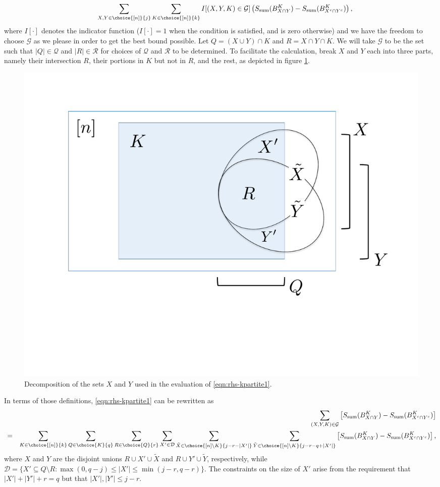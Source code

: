 \documentclass[12pt]{article}
\newcommand{\beq}{\begin{eqnarray}}
\newcommand{\eeq}{\end{eqnarray}}
\def\Sadd{{S_{\text{sum}}}}
\numberwithin{equation}{section}
\begin{document}
\beq
&\,& \sum_{X,Y \in \choice{[n]}{j}} \sum_{K \in \choice{[n]}{k}}
	I[ (X,Y,K) \in \mathcal{G} ]
	\left( \Sadd( B_{X \cap Y }^K ) - \Sadd( B^K_{X^c \cap Y^c} ) \right), \label{eqn:rhs-kpartite1}
\eeq
where $I[\cdot]$ denotes the indicator function ($I[{\cdot}] =1$ when the condition is satisfied, and is zero otherwise) and we have the freedom to choose $\mathcal{G}$ as we please in order to get the best bound possible. Let $Q= (X \cup Y) \cap K$ and $R = X \cap Y \cap K$. We will take $\mathcal{G}$ to be the set such that $|Q| \in \mathcal{Q}$ and $|R| \in \mathcal{R}$ for choices of $\mathcal{Q}$ and $\mathcal{R}$ to be determined. To facilitate the calculation, break $X$ and $Y$ each into three parts, namely their intersection $R$, their portions in $K$ but not in $R$, and the rest, as depicted in figure \ref{fig:combipic}.
%
\begin{figure}
\centering
\includegraphics[keepaspectratio,width=0.5\linewidth]{combipic.pdf}
\caption{Decomposition of the sets $X$ and $Y$ used in the evaluation of \eqref{eqn:rhs-kpartite1}.}
\label{fig:combipic}
\end{figure}
%
In terms of those definitions, \eqref{eqn:rhs-kpartite1} can be rewritten as
\beq
&\,& \sum_{(X,Y,K)\in \mathcal{G}}
	\left[ \Sadd( B_{X \cap Y }^K ) - \Sadd( B^K_{X^c \cap Y^c} ) \right] \\
&=& \sum_{K \in \choice{[n]}{k}} \sum_{Q \in \choice{K}{q}} \sum_{R \in \choice{Q}{r}}
	\sum_{X' \in \mathcal{D}} \sum_{\tilde{X} \in \choice{[n] \setminus K}{j-r-|X'|}}
	\sum_{\tilde{Y} \in \choice{[n] \setminus K}{j-r-q+|X'|}}
	\left[ \Sadd( B_{X \cap Y }^K ) - \Sadd( B^K_{X^c \cap Y^c} ) \right], \label{eqn:horrible}
\eeq
where $X$ and $Y$ are the disjoint unions $R \cup X' \cup \tilde{X}$ and $R \cup Y' \cup \tilde{Y}$, respectively, while $\mathcal{D} = \{ X' \subseteq Q \setminus R : \max(0,q-j) \leq |X'| \leq \min (j-r,q-r) \}$. The constraints on the size of $X'$ arise from the requirement that $|X'| + |Y'| + r = q$ but that $|X'|, |Y'| \leq j - r$.
\end{document}

